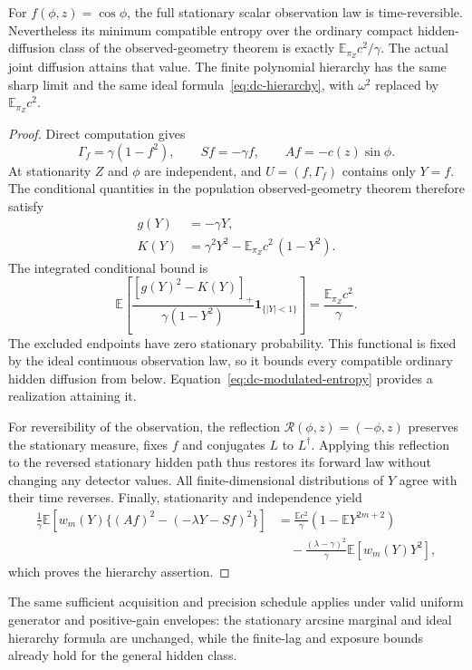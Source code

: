 \begin{proposition}
For $f(\phi,z)=\cos\phi$, the full stationary scalar observation law is
time-reversible.  Nevertheless its minimum compatible entropy over the
ordinary compact hidden-diffusion class of the observed-geometry theorem is
exactly $\mathbb E_{\pi_Z}c^2/\gamma$.  The actual joint diffusion attains
that value.  The finite polynomial hierarchy has the same sharp limit and
the same ideal formula~\eqref{eq:dc-hierarchy}, with
$\omega^2$ replaced by $\mathbb E_{\pi_Z}c^2$.
\end{proposition}
\begin{proof}
Direct computation gives
\[
 \Gamma_f=\gamma(1-f^2),\qquad Sf=-\gamma f,\qquad
 Af=-c(z)\sin\phi.
\]
At stationarity $Z$ and $\phi$ are independent, and
$U=(f,\Gamma_f)$ contains only $Y=f$.  The conditional quantities in the
population observed-geometry theorem therefore satisfy
\begin{align*}
 g(Y)&=-\gamma Y,\\
 K(Y)&=\gamma^2Y^2
       -\mathbb E_{\pi_Z}c^2\,(1-Y^2).
\end{align*}
The integrated conditional bound is
\[
 \mathbb E\left[
 \frac{[g(Y)^2-K(Y)]_+}{\gamma(1-Y^2)}
       \boldsymbol 1_{\{|Y|<1\}}\right]
 =\frac{\mathbb E_{\pi_Z}c^2}{\gamma}.
\]
The excluded endpoints have zero stationary probability.  This functional is
fixed by the ideal continuous observation law, so it bounds every compatible
ordinary hidden diffusion from below.  Equation~\eqref{eq:dc-modulated-entropy}
provides a realization attaining it.

For reversibility of the observation, the reflection
$\mathcal R(\phi,z)=(-\phi,z)$ preserves the stationary measure, fixes $f$
and conjugates $L$ to $L^\dagger$.  Applying this reflection to the reversed
stationary hidden path thus restores its forward law without changing any
detector values.  All finite-dimensional distributions of $Y$ agree with
their time reverses.  Finally, stationarity and independence yield
\begin{align*}
 \frac1\gamma\mathbb E\left[
 w_m(Y)\{(Af)^2-(-\lambda Y-Sf)^2\}\right]
 &={}\frac{\mathbb E c^2}{\gamma}
       (1-\mathbb EY^{2m+2})\\
 &\quad-\frac{(\lambda-\gamma)^2}{\gamma}
       \mathbb E[w_m(Y)Y^2],
\end{align*}
which proves the hierarchy assertion.
\end{proof}

The same sufficient acquisition and precision schedule applies under valid
uniform generator and positive-gain envelopes: the stationary arcsine
marginal and ideal hierarchy formula are unchanged, while the finite-lag
and exposure bounds already hold for the general hidden class.

